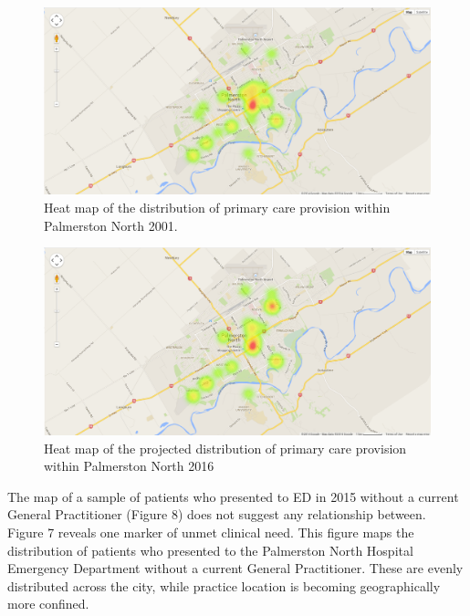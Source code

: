 \documentclass[11pt,a4paper]{article}
\begin{document}
\begin{figure}[htp]
\centering
\includegraphics[scale=0.3]{fig6.png}
\caption{Heat map of the distribution of primary care provision within Palmerston North 2001.}
\label{Heat map of practitioners 2001}
\end{figure}  


\begin{figure}[htp]
\centering
\includegraphics[scale=0.30]{fig7.png}
\caption{Heat map of the projected distribution of primary care provision within Palmerston North 2016}
\label{Heat map of the projected distribution of primary care provision within Palmerston North 2016}
\end{figure}


The map of a sample of patients who presented to ED in 2015 without a current General Practitioner (Figure 8) does not suggest any relationship between.\\


Figure 7 reveals one marker of unmet clinical need. This figure maps the distribution of patients who presented to the Palmerston North Hospital Emergency Department without a current General Practitioner. These are evenly distributed across the city, while practice location is becoming geographically more confined. \\
\end{document}
